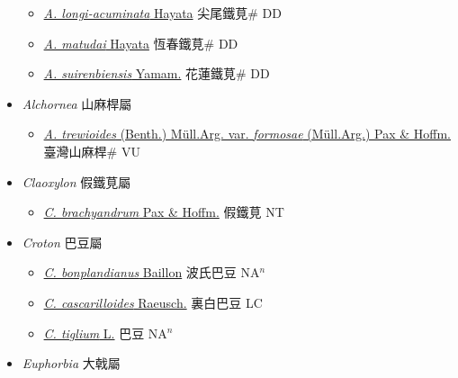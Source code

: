 \begin{itemize}
\begin{itemize}
        \item[] \href{http://www.theplantlist.org/tpl1.1/search?q=Acalypha+longi-acuminata}{\textit{A. longi-acuminata} Hayata}   尖尾鐵莧\# DD
        \item[] \href{http://www.theplantlist.org/tpl1.1/search?q=Acalypha+matudai}{\textit{A. matudai} Hayata}   恆春鐵莧\# DD
        \item[] \href{http://www.theplantlist.org/tpl1.1/search?q=Acalypha+suirenbiensis}{\textit{A. suirenbiensis} Yamam.}   花蓮鐵莧\# DD
  \end{itemize}
 \item[] \textit{Alchornea} 山麻桿屬
                    
  \begin{itemize}
        \item[] \href{http://www.theplantlist.org/tpl1.1/search?q=Alchornea+trewioides+var.+formosae}{\textit{A. trewioides} (Benth.) Müll.Arg. var. \textit{formosae} (Müll.Arg.) Pax \& Hoffm.}   臺灣山麻桿\# VU
  \end{itemize}
 \item[] \textit{Claoxylon} 假鐵莧屬
                    
  \begin{itemize}
        \item[] \href{http://www.theplantlist.org/tpl1.1/search?q=Claoxylon+brachyandrum}{\textit{C. brachyandrum} Pax \& Hoffm.}   假鐵莧 NT
  \end{itemize}
 \item[] \textit{Croton} 巴豆屬
                    
  \begin{itemize}
        \item[] \href{http://www.theplantlist.org/tpl1.1/search?q=Croton+bonplandianus}{\textit{C. bonplandianus} Baillon}   波氏巴豆 NA$^n$
        \item[] \href{http://www.theplantlist.org/tpl1.1/search?q=Croton+cascarilloides}{\textit{C. cascarilloides} Raeusch.}   裏白巴豆 LC
        \item[] \href{http://www.theplantlist.org/tpl1.1/search?q=Croton+tiglium}{\textit{C. tiglium} L.}   巴豆 NA$^n$
  \end{itemize}
 \item[] \textit{Euphorbia} 大戟屬
                    

\end{itemize}
